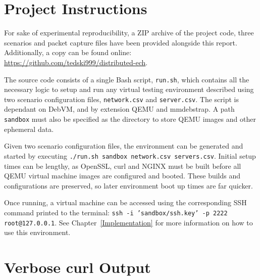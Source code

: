 \chapter{Project Instructions}

For sake of experimental reproducibility, a ZIP archive of the project code, three scenarios and packet capture files have been provided alongside this report. Additionally, a copy can be found online: \url{https://github.com/tedski999/distributed-ech}.

The source code consists of a single Bash script, \texttt{run.sh}, which contains all the necessary logic to setup and run any virtual testing environment described using two scenario configuration files, \texttt{network.csv} and \texttt{server.csv}. The script is dependant on DebVM, and by extension QEMU and mmdebstrap. A path \texttt{sandbox} must also be specified as the directory to store QEMU images and other ephemeral data.

Given two scenario configuration files, the environment can be generated and started by executing \texttt{./run.sh sandbox network.csv servers.csv}. Initial setup times can be lengthy, as OpenSSL, curl and NGINX must be built before all QEMU virtual machine images are configured and booted. These builds and configurations are preserved, so later environment boot up times are far quicker.

Once running, a virtual machine can be accessed using the corresponding SSH command printed to the terminal: \texttt{ssh -i 'sandbox/ssh.key' -p 2222 root@127.0.0.1}. See Chapter~\ref{Implementation} for more information on how to use this environment.

\chapter{Verbose curl Output}

\inputminted[tabsize=2,breaklines,breakanywhere]{text}{snippets/curl}
